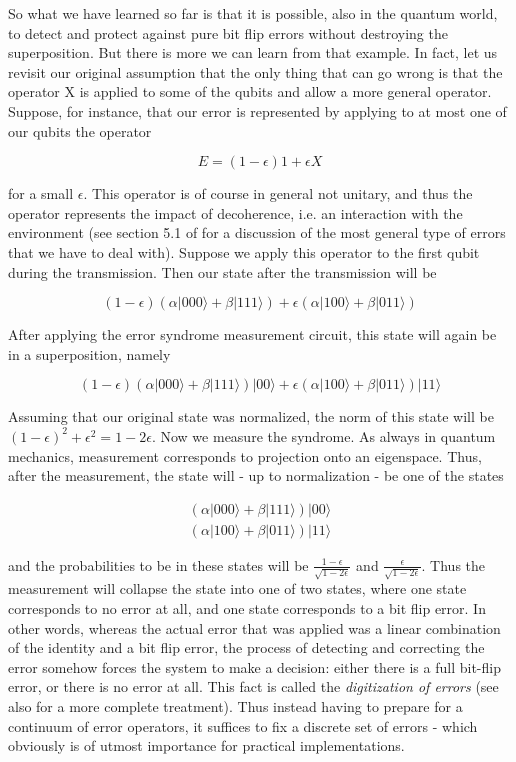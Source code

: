\documentclass[a4paper, draft]{article}
\theoremstyle{own}
\theoremstyle{remark}
\begin{document}
So what we have learned so far is that it is possible, also in the quantum world, to detect and protect against pure bit flip errors without destroying the superposition. But there is more we can learn from that example. In fact, let us revisit our original assumption that the only thing that can go wrong is that the operator X is applied to some of the qubits and allow a more general operator. Suppose, for instance, that our error is represented by applying to at most one of our qubits the operator

$$
E = (1-\epsilon) 1 + \epsilon X
$$

for a small $\epsilon$. This operator is of course in general not unitary, and thus the operator represents the impact of decoherence, i.e. an interaction with the environment (see section 5.1 of \cite{Steane} for a discussion of the most general type of errors that we have to deal with). Suppose we apply this operator to the first qubit during the transmission. Then our state after the transmission will be

$$
(1-\epsilon)(\alpha |000 \rangle + \beta |111 \rangle) + \epsilon (\alpha |100 \rangle + \beta |011\rangle)
$$

After applying the error syndrome measurement circuit, this state will again be in a superposition, namely 

$$
(1-\epsilon)(\alpha |000 \rangle + \beta |111 \rangle)|00\rangle + \epsilon (\alpha |100 \rangle + \beta |011\rangle) |11 \rangle
$$

Assuming that our original state was normalized, the norm of this state will be $(1-\epsilon)^2 + \epsilon^2 = 1 - 2\epsilon$. Now we measure the syndrome. As always in quantum mechanics, measurement corresponds to projection onto an eigenspace. Thus, after the measurement, the state will - up to normalization - be one of the states

\begin{align*}
(\alpha |000 \rangle + \beta |111 \rangle)|00\rangle \\
(\alpha |100 \rangle + \beta |011\rangle) |11 \rangle
\end{align*}

and the probabilities to be in these states will be $\frac{1-\epsilon}{\sqrt{1-2\epsilon}}$ and $\frac{\epsilon}{\sqrt{1-2\epsilon}}$. Thus the measurement will collapse the state into one of two states, where one state corresponds to no error at all, and one state corresponds to a bit flip error. In other words, whereas the actual error that was applied was a linear combination of the identity and a bit flip error, the process of detecting and correcting the error somehow forces the system to make a decision: either there is a full bit-flip error, or there is no error at all. This fact is called the {\em digitization of errors} (see also \cite{Steane} for a more complete treatment). Thus instead having to prepare for a continuum of error operators, it suffices to fix a discrete set of errors - which obviously is of utmost importance for practical implementations.
\end{document}

